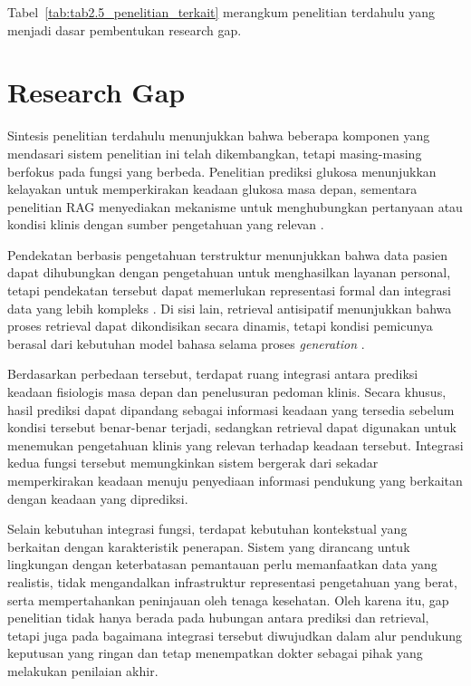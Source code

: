 Tabel~\ref{tab:tab2.5_penelitian_terkait} merangkum penelitian terdahulu yang menjadi dasar pembentukan research gap.



\section{Research Gap}
\label{sec:bab2-research-gap}

Sintesis penelitian terdahulu menunjukkan bahwa beberapa komponen yang mendasari sistem penelitian ini telah dikembangkan, tetapi masing-masing berfokus pada fungsi yang berbeda. 
Penelitian prediksi glukosa menunjukkan kelayakan untuk memperkirakan keadaan glukosa masa depan, sementara penelitian RAG menyediakan mekanisme untuk menghubungkan pertanyaan 
atau kondisi klinis dengan sumber pengetahuan yang relevan \parencite{woldaregay2019,ghimire2024,kresevic2024,lee2024,wang2024}.

Pendekatan berbasis pengetahuan terstruktur menunjukkan bahwa data pasien dapat dihubungkan dengan pengetahuan untuk menghasilkan layanan personal, tetapi pendekatan tersebut dapat 
memerlukan representasi formal dan integrasi data yang lebih kompleks \parencite{rad2024}. Di sisi lain, retrieval antisipatif menunjukkan bahwa proses retrieval dapat dikondisikan
secara dinamis, tetapi kondisi pemicunya berasal dari kebutuhan model bahasa selama proses \textit{generation} \parencite{jiang2023}.

Berdasarkan perbedaan tersebut, terdapat ruang integrasi antara prediksi keadaan fisiologis masa depan dan penelusuran pedoman klinis. Secara khusus, hasil prediksi dapat dipandang 
sebagai informasi keadaan yang tersedia sebelum kondisi tersebut benar-benar terjadi, sedangkan retrieval dapat digunakan untuk menemukan pengetahuan klinis yang relevan terhadap 
keadaan tersebut. Integrasi kedua fungsi tersebut memungkinkan sistem bergerak dari sekadar memperkirakan keadaan menuju penyediaan informasi pendukung yang berkaitan dengan keadaan yang diprediksi.

Selain kebutuhan integrasi fungsi, terdapat kebutuhan kontekstual yang berkaitan dengan karakteristik penerapan. Sistem yang dirancang untuk lingkungan dengan keterbatasan pemantauan 
perlu memanfaatkan data yang realistis, tidak mengandalkan infrastruktur representasi pengetahuan yang berat, serta mempertahankan peninjauan oleh tenaga kesehatan. Oleh karena
itu, gap penelitian tidak hanya berada pada hubungan antara prediksi dan retrieval, tetapi juga pada bagaimana integrasi tersebut diwujudkan dalam alur pendukung keputusan yang 
ringan dan tetap menempatkan dokter sebagai pihak yang melakukan penilaian akhir.

